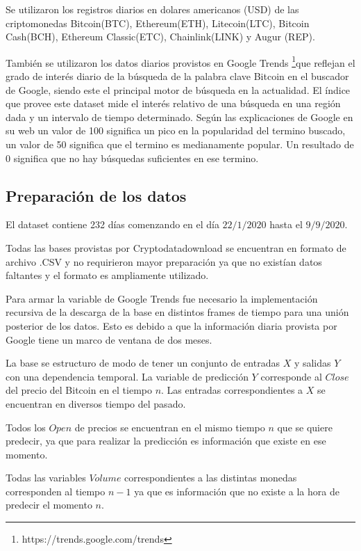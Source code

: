\documentclass[a4paper,12pt,twocolumn]{article}
\begin{document}
Se utilizaron los registros diarios en dolares americanos (USD)  de las criptomonedas Bitcoin(BTC), Ethereum(ETH), Litecoin(LTC), Bitcoin Cash(BCH), Ethereum Classic(ETC), Chainlink(LINK) y  Augur (REP). 
 

También se utilizaron los datos diarios provistos en Google Trends \footnote{https://trends.google.com/trends }que reflejan el grado de interés diario de la búsqueda de la palabra clave Bitcoin en el buscador de Google, siendo este el principal motor de búsqueda en la actualidad. El índice que provee este dataset mide el interés relativo de una búsqueda en una región dada y un intervalo de tiempo determinado. Según las explicaciones de Google en su web un valor de 100 significa un pico en la popularidad del termino buscado, un valor de 50 significa que el termino es medianamente popular. Un resultado de 0 significa que no hay búsquedas suficientes en ese termino. 

\subsection{Preparación de los datos}

El dataset contiene 232 días comenzando en el día $22/1/2020$  hasta el $9/9/2020$. 

Todas las bases provistas por Cryptodatadownload se encuentran en formato de archivo .CSV y no requirieron mayor preparación ya que no existían datos faltantes y el formato es ampliamente utilizado. 

Para armar la variable de Google Trends fue necesario la implementación recursiva de la descarga de la base en distintos frames de tiempo para una unión posterior  de los datos. Esto es debido a que la información diaria provista por Google tiene un marco de ventana de dos meses. 

La base se estructuro de modo de tener un conjunto de entradas $X$ y salidas $Y$ con una dependencia temporal. La variable de predicción $Y$ corresponde al $Close$ del precio del Bitcoin en el tiempo $n$. Las entradas correspondientes a $X$ se encuentran en diversos tiempo del pasado. 

Todos los $Open$ de precios se encuentran en el mismo tiempo $n$ que se quiere predecir, ya que para realizar la predicción es información que existe en ese momento. 

Todas las variables $Volume$ correspondientes a las distintas monedas corresponden al tiempo $n-1$ ya que es información que no existe a la hora de predecir el momento $n$.
\end{document}
